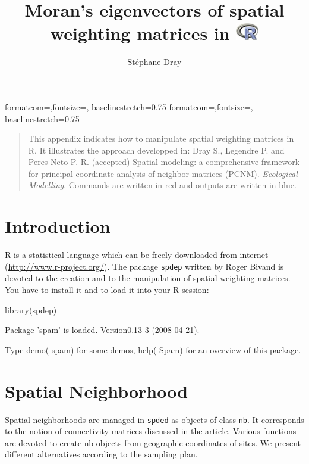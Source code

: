 \documentclass[a4paper]{article}
\begin{document}
{formatcom={\color{Sinput}},fontsize=\footnotesize, baselinestretch=0.75}
{formatcom={\color{Soutput}},fontsize=\footnotesize, baselinestretch=0.75}

\title{Moran's eigenvectors of spatial weighting matrices in \includegraphics[width=1cm,keepaspectratio]{figs/Rlogo}}
\author{Stéphane Dray}
\maketitle


\begin{quote}
This appendix indicates how to manipulate spatial weighting matrices in R. It illustrates the approach developped in:
 Dray S., Legendre P. and Peres-Neto P. R. (accepted)
  Spatial modeling: a comprehensive framework for principal coordinate
  analysis of neighbor matrices (PCNM). \textit{Ecological Modelling}.
Commands are written in red and outputs are written in blue.
\end{quote} 
\tableofcontents
\section{Introduction}
R  is a statistical language which can be freely downloaded from internet (\url{http://www.r-project.org/}). The package \texttt{spdep} written by Roger Bivand is devoted to the creation and to the manipulation of spatial weighting matrices. You have to install it and to load it into your R session:
\begin{Schunk}
\begin{Sinput}
 library(spdep)
\end{Sinput}
\begin{Soutput}
Package 'spam' is loaded.  Version0.13-3 (2008-04-21).

Type demo( spam) for some demos,
 help( Spam) for an overview of this package.
\end{Soutput}
\end{Schunk}

\section{Spatial Neighborhood}
Spatial neighborhoods are managed in \texttt{spded} as objects of class \texttt{nb}. It corresponds to the notion of connectivity matrices discussed in the article. Various functions are devoted to create nb objects from geographic coordinates of sites. We present different alternatives according to the sampling plan.
\end{document}
